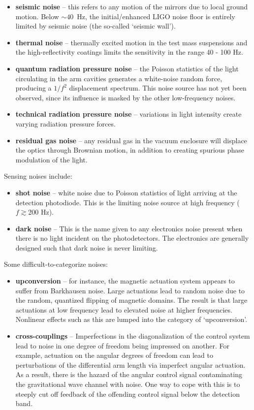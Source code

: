 \begin{itemize}
\item \textbf{seismic noise} -- this refers to any motion of the mirrors due to
  local ground motion.  Below $\sim40$~Hz, the initial/enhanced LIGO
  noise floor is entirely limited by seismic noise (the so-called `seismic wall').
\item \textbf{thermal noise} -- thermally excited motion in the test mass
  suspensions and the high-reflectivity coatings limits the
  sensitivity in the range 40 - 100 Hz.
\item \textbf{quantum radiation pressure noise} -- the Poisson statistics of
  the light circulating in the arm cavities generates a white-noise
  random force, producing a $1/f^2$ displacement spectrum.  This noise
  source has not yet been observed, since its influence is masked by
  the other low-frequency noises.
\item \textbf{technical radiation pressure noise} -- variations in
  light intensity create varying radiation pressure forces.
\item \textbf{residual gas noise} -- any residual gas in the vacuum
  enclosure will displace the optics through Brownian motion, in addition to
  creating spurious phase modulation of the light.

\end{itemize}
Sensing noises include:
\begin{itemize}
\item \textbf{shot noise} -- white noise due to Poisson statistics of
  light arriving at the detection photodiode.  This is the limiting
  noise source at high frequency ($f\gtrsim$200 Hz).
\item \textbf{dark noise} -- This is the name given to any electronics
  noise present when there is no light incident on the photodetectors.
  The electronics are generally designed such that dark noise is never
  limiting.
\end{itemize}
Some difficult-to-categorize noises:
\begin{itemize}
\item \textbf{upconversion} -- for instance, the magnetic actuation
  system appears to suffer from Barkhausen noise.  Large actuations
  lead to random noise due to the random, quantized flipping of
  magnetic domains. The result is that large actuations at low
  frequency lead to elevated noise at higher frequencies.  Nonlinear
  effects such as this are lumped into the category of `upconversion'.
\item \textbf{cross-couplings} -- Imperfections in the diagonalization
  of the control system lead to noise in one degree of freedom being
  impressed on another.  For example, actuation on the angular degrees
  of freedom can lead to perturbations of the differential arm length
  via imperfect angular actuation.  As a result, there is the hazard
  of the angular control signal contaminating the gravitational wave
  channel with noise.  One way to cope with this is to steeply cut off
  feedback of the offending control signal below the detection band.
\end{itemize}

